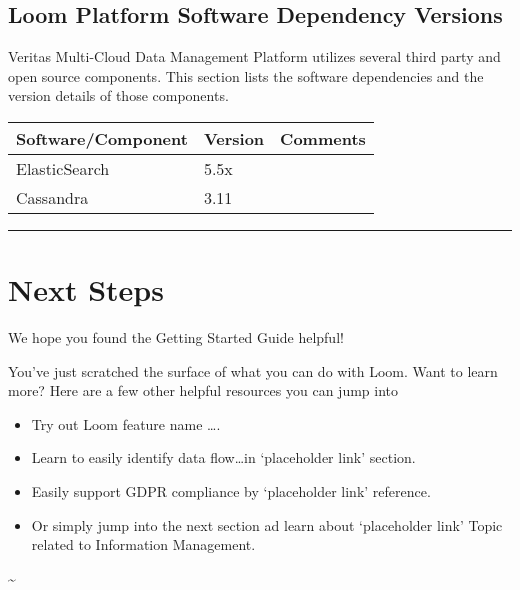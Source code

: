 \documentclass[letterpaper,10pt,english]{sphinxmanual}
\begin{document}
\section{Loom Platform Software Dependency Versions}
\label{\detokenize{loom_getting_started_guide:loom-platform-software-dependency-versions}}\label{\detokenize{loom_getting_started_guide:content-gsg-mcdmp-dep-ver}}
Veritas Multi-Cloud Data Management Platform utilizes several third party and open source components.  This section lists the software dependencies and the version details of those components.


\begin{savenotes}\sphinxattablestart
\centering
\begin{tabulary}{\linewidth}[t]{|T|T|T|}
\hline

Software/Component
&
Version
&
Comments
\\
\hline
ElasticSearch
&
5.5x
&\\
\hline
Cassandra
&
3.11
&\\
\hline
\end{tabulary}
\par
\sphinxattableend\end{savenotes}


\bigskip\hrule\bigskip



\chapter{Next Steps}
\label{\detokenize{loom_getting_started_guide:next-steps}}
We hope you found the Getting Started Guide helpful!

You’ve just scratched the surface of what you can do with Loom.
Want to learn more? Here are a few other helpful resources you can jump into
\begin{itemize}
\item {} 
Try out Loom feature name ….

\item {} 
Learn to easily identify data flow…in ‘placeholder link’ section.

\item {} 
Easily support GDPR compliance by ‘placeholder link’ reference.

\item {} 
Or simply jump into the next section ad learn about ‘placeholder link’ Topic related to Information Management.

\end{itemize}

\textasciitilde{}



\renewcommand{\indexname}{Index}
\printindex
\end{document}
